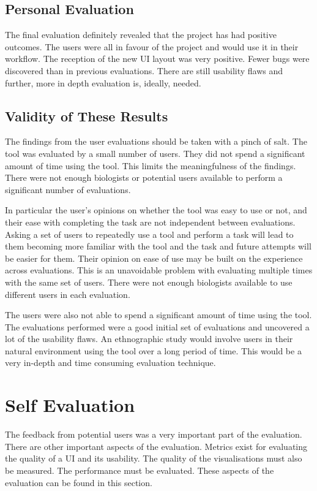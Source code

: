 \subsection{Personal Evaluation}

The final evaluation definitely revealed that the project has had positive outcomes.  The users were all in favour of the project and would use it in their workflow.  The reception of the new \ac{UI} layout was very positive.  Fewer bugs were discovered than in previous evaluations. There are still usability flaws and further, more in depth evaluation is, ideally, needed.

\subsection{Validity of These Results}
The findings from the user evaluations should be taken with a pinch of salt.  The tool was evaluated by a small number of users.  They did not spend a significant amount of time using the tool.  This limits the meaningfulness of the findings.  There were not enough biologists or potential users available to perform a significant number of evaluations.

In particular the user's opinions on whether the tool was easy to use or not, and their ease with completing the task are not independent between evaluations.  Asking a set of users to repeatedly use a tool and perform a task will lead to them becoming more familiar with the tool and the task and future attempts will be easier for them.  Their opinion on ease of use may be built on the experience across evaluations.  This is an unavoidable problem with evaluating multiple times with the same set of users.  There were not enough biologists available to use different users in each evaluation.

The users were also not able to spend a significant amount of time using the tool.  The evaluations performed were a good initial set of evaluations and uncovered a lot of the usability flaws.  An ethnographic study would involve users in their natural environment using the tool over a long period of time.  This would be a very in-depth and time consuming evaluation technique.

\section{Self Evaluation}
The feedback from potential users was a very important part of the evaluation.  There are other important aspects of the evaluation.  Metrics exist for evaluating the quality of a \ac{UI} and its usability.  The quality of the visualisations must also be measured.  The performance must be evaluated.  These aspects of the evaluation can be found in this section.

